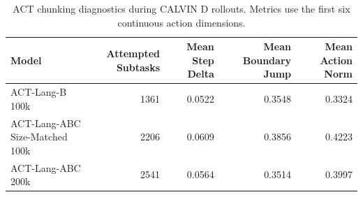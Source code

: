 \begin{table}[t]
\centering
\caption{ACT chunking diagnostics during CALVIN D rollouts. Metrics use the first six continuous action dimensions.}
\label{tab:task3-rollout-chunk-diagnostics-d}
\begin{tabular}{lrrrr}
\toprule
Model & Attempted Subtasks & Mean Step Delta & Mean Boundary Jump & Mean Action Norm \\
\midrule
ACT-Lang-B 100k & 1361 & 0.0522 & 0.3548 & 0.3324 \\
ACT-Lang-ABC Size-Matched 100k & 2206 & 0.0609 & 0.3856 & 0.4223 \\
ACT-Lang-ABC 200k & 2541 & 0.0564 & 0.3514 & 0.3997 \\
\bottomrule
\end{tabular}
\end{table}
